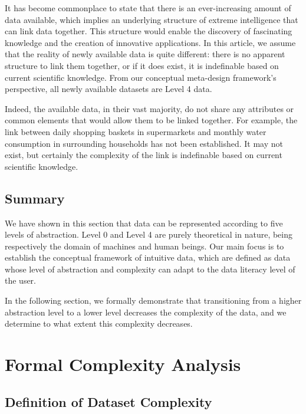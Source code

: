 \documentclass[12pt,a4paper]{article}
\begin{document}
\vspace{1em}

\noindent It has become commonplace to state that there is an ever-increasing amount of data available, which implies an underlying structure of extreme intelligence that can link data together. This structure would enable the discovery of fascinating knowledge and the creation of innovative applications. In this article, we assume that the reality of newly available data is quite different: there is no apparent structure to link them together, or if it does exist, it is indefinable based on current scientific knowledge. From our conceptual meta-design framework's perspective, all newly available datasets are Level 4 data.

Indeed, the available data, in their vast majority, do not share any attributes or common elements that would allow them to be linked together. For example, the link between daily shopping baskets in supermarkets and monthly water consumption in surrounding households has not been established. It may not exist, but certainly the complexity of the link is indefinable based on current scientific knowledge.

\subsection{Summary}

We have shown in this section that data can be represented according to five levels of abstraction. Level 0 and Level 4 are purely theoretical in nature, being respectively the domain of machines and human beings. Our main focus is to establish the conceptual framework of intuitive data, which are defined as data whose level of abstraction and complexity can adapt to the data literacy level of the user.

In the following section, we formally demonstrate that transitioning from a higher abstraction level to a lower level decreases the complexity of the data, and we determine to what extent this complexity decreases.

\section{Formal Complexity Analysis}
\label{sec:complexity}

\subsection{Definition of Dataset Complexity}
\end{document}
